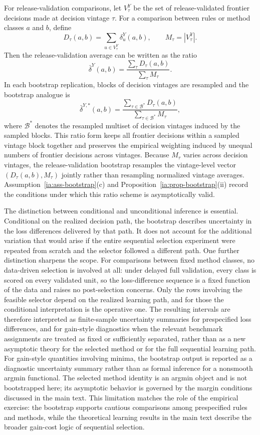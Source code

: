 \documentclass[a4paper,12pt]{article}
\newcommand{\1}{\mathbf{1}}
\begin{document}
For release-validation comparisons, let $V^Y_\tau$ be the set of release-validated frontier decisions made at decision vintage $\tau$. For a comparison between rules or method classes $a$ and $b$, define
\[
    D_\tau(a,b)=\sum_{u\in V^Y_\tau}\delta^Y_u(a,b),
    \qquad
    M_\tau=|V^Y_\tau|.
\]
Then the release-validation average can be written as the ratio
\[
    \bar\delta^Y(a,b)
    =
    \frac{\sum_\tau D_\tau(a,b)}{\sum_\tau M_\tau}.
\]
In each bootstrap replication, blocks of decision vintages are resampled and the bootstrap analogue is
\[
    \bar\delta^{Y,\ast}(a,b)
    =
    \frac{\sum_{\tau\in\mathcal B^\ast}D_\tau(a,b)}
    {\sum_{\tau\in\mathcal B^\ast}M_\tau},
\]
where $\mathcal B^\ast$ denotes the resampled multiset of decision vintages induced by the sampled blocks. This ratio form keeps all frontier decisions within a sampled vintage block together and preserves the empirical weighting induced by unequal numbers of frontier decisions across vintages. Because $M_\tau$ varies across decision vintages, the release-validation bootstrap resamples the vintage-level vector $(D_\tau(a,b),M_\tau)$ jointly rather than resampling normalized vintage averages. Assumption~\ref{ia:ass-bootstrap}(c) and Proposition~\ref{ia:prop-bootstrap}(ii) record the conditions under which this ratio scheme is asymptotically valid.

The distinction between conditional and unconditional inference is essential. Conditional on the realized decision path, the bootstrap describes uncertainty in the loss differences delivered by that path. It does not account for the additional variation that would arise if the entire sequential selection experiment were repeated from scratch and the selector followed a different path. One further distinction sharpens the scope. For comparisons between fixed method classes, no data-driven selection is involved at all: under delayed full validation, every class is scored on every validated unit, so the loss-difference sequence is a fixed function of the data and raises no post-selection concerns. Only the rows involving the feasible selector depend on the realized learning path, and for those the conditional interpretation is the operative one. The resulting intervals are therefore interpreted as finite-sample uncertainty summaries for prespecified loss differences, and for gain-style diagnostics when the relevant benchmark assignments are treated as fixed or sufficiently separated, rather than as a new asymptotic theory for the selected method or for the full sequential learning path. For gain-style quantities involving minima, the bootstrap output is reported as a diagnostic uncertainty summary rather than as formal inference for a nonsmooth argmin functional. The selected method identity is an argmin object and is not bootstrapped here; its asymptotic behavior is governed by the margin conditions discussed in the main text. This limitation matches the role of the empirical exercise: the bootstrap supports cautious comparisons among prespecified rules and methods, while the theoretical learning results in the main text describe the broader gain-cost logic of sequential selection.
\end{document}
